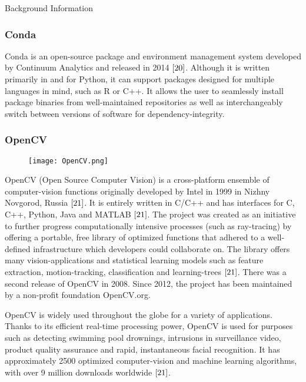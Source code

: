 \documentclass[a4paper,12pt]{article}
\begin{document}
\begin{section}{Background Information}
\subsubsection{Conda}

Conda is an open-source package and environment management system developed by Continuum Analytics and released in 2014 $\cite{20}$. Although it is written primarily in and for Python, it can support packages designed for multiple languages in mind, such as R or C++. It allows the user to seamlessly install package binaries from well-maintained repositories as well as interchangeably switch between versions of software for dependency-integrity. 

\subsubsection{OpenCV}

\begin{wrapfigure}{L}{0.2\textwidth}
\begin{center}
\centering
\texttt{[image: OpenCV.png]}
\end{center}
\end{wrapfigure}


OpenCV (Open Source Computer Vision) is a cross-platform ensemble of computer-vision functions originally developed by Intel in 1999 in Nizhny Novgorod, Russia $\cite{21}$. It is entirely written in C/C++ and has interfaces for C, C++, Python, Java and MATLAB $\cite{21}$. The project was created as an initiative to further progress computationally intensive processes (such as ray-tracing) by offering a portable, free library of optimized functions that adhered to a well-defined infrastructure which developers could collaborate on. The library offers many vision-applications and statistical learning models such as feature extraction, motion-tracking, classification and learning-trees $\cite{21}$. There was a second release of OpenCV in 2008. Since 2012, the project has been maintained by a non-profit foundation OpenCV.org. 

OpenCV is widely used throughout the globe for a variety of applications. Thanks to its efficient real-time processing power, OpenCV is used for purposes such as detecting swimming pool drownings, intrusions in surveillance video, product quality assurance and rapid, instantaneous facial recognition. It has approximately 2500 optimized computer-vision and machine learning algorithms, with over 9 million downloads worldwide $\cite{21}$.


\end{section}
\end{document}
